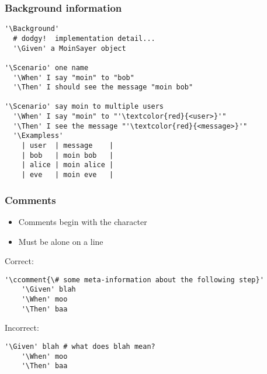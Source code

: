 \documentclass[10pt]{vcs_beamer}
\newcommand{\ccomment}[1]{\color{DarkBlue}{#1}}
\newcommand{\Background}{\color{BlueViolet}{Background:}}
\newcommand{\Scenario}{\color{BlueViolet}{Scenario:}}
\newcommand{\Exampless}{\color{BlueViolet}{Examples:}}
\newcommand{\Given}{\color{DarkOrange}{Given}}
\newcommand{\When}{\color{RoyalBlue}{When}}
\newcommand{\Then}{\color{ForestGreen}{Then}}
\begin{document}
\begin{frame}[fragile]
\frametitle{Background information}

\begin{lstlisting}[escapeinside='']
'\Background'
  # dodgy!  implementation detail...
  '\Given' a MoinSayer object

'\Scenario' one name
  '\When' I say "moin" to "bob"
  '\Then' I should see the message "moin bob"

'\Scenario' say moin to multiple users
  '\When' I say "moin" to "'\textcolor{red}{<user>}'"
  '\Then' I see the message "'\textcolor{red}{<message>}'"
  '\Exampless'
    | user  | message    |
    | bob   | moin bob   |
    | alice | moin alice |
    | eve   | moin eve   |
\end{lstlisting}

\end{frame}

\begin{frame}[fragile]
    \frametitle{Comments}

    \begin{itemize}
        \item Comments begin with the \ttt{\#} character
        \item Must be alone on a line
    \end{itemize}

    Correct:
    \begin{lstlisting}[escapeinside='']
    '\ccomment{\# some meta-information about the following step}'
    '\Given' blah
    '\When' moo
    '\Then' baa
    \end{lstlisting}


    Incorrect:
    \begin{lstlisting}[escapeinside='']
    '\Given' blah # what does blah mean?
    '\When' moo
    '\Then' baa
    \end{lstlisting}
\end{frame}
\end{document}
